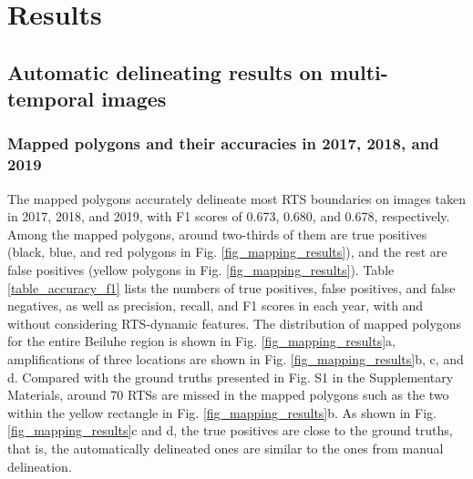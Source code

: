 \documentclass[authoryear,preprint,review,12pt]{elsarticle}
\begin{document}
\section{Results}
\label{sec_result}


\subsection{Automatic delineating results on multi-temporal images}
\label{sec_result_auto_deliea}


\subsubsection{Mapped polygons and their accuracies in 2017, 2018, and 2019}
\label{sec_mapped_polygons}

The mapped polygons accurately delineate most RTS boundaries on images taken in 2017, 2018, and 2019, with F1 scores of 0.673, 0.680, and 0.678, respectively.
Among the mapped polygons, around two-thirds of them are true positives (black, blue, and red polygons in Fig. \ref{fig_mapping_results}), and the rest are false positives (yellow polygons in Fig. \ref{fig_mapping_results}). 
Table \ref{table_accuracy_f1} lists the numbers of true positives, false positives, and false negatives, as well as precision, recall, and F1 scores in each year, with and without considering RTS-dynamic features.
The distribution of mapped polygons for the entire Beiluhe region is shown in Fig. \ref{fig_mapping_results}a, amplifications of three locations are shown in Fig. \ref{fig_mapping_results}b, c, and d. 
Compared with the ground truths presented in Fig. S1 in the Supplementary Materials,  around 70 RTSs are missed in the mapped polygons such as the two within the yellow rectangle in Fig. \ref{fig_mapping_results}b.
As shown in Fig. \ref{fig_mapping_results}c and d, the true positives are close to the ground truths, that is, the automatically delineated ones are similar to the ones from manual delineation. 
\end{document}
